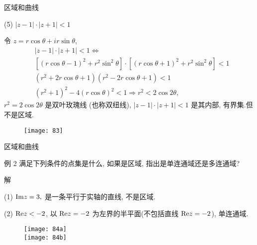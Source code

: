 \documentclass{beamer}
\begin{document}
\begin{frame}{区域和曲线}
\begin{block}{}
(5) $ \left| {z - 1} \right| \cdot \left| {z + 1} \right| < 1 $ 

令 $ z = r\cos \theta + ir\sin \theta $, 
\begin{align*}
&\left| {z - 1} \right| \cdot \left| {z + 1} \right| < 1 \Leftrightarrow\\
&[{(r\cos \theta - 1)^2} + {r^2}{\sin ^2}\theta ] \cdot [{(r\cos \theta + 1)^2} + {r^2}{\sin ^2}\theta ] < 1\\
&({r^2} + 2r\cos \theta + 1)({r^2} - 2r\cos \theta + 1) < 1\\
&{({r^2} + 1)^2} - 4{(r\cos \theta )^2} < 1 \Rightarrow {r^2} < 2\cos 2\theta, 
\end{align*}
 $ {r^2} = 2\cos 2\theta $ 是双叶玫瑰线 (也称双纽线),  $ \left| {z - 1} \right| \cdot \left| {z + 1} \right| < 1 $ 是其内部, 有界集.但不是区域.
\begin{figure}
\texttt{[image: 83]}
\end{figure}

\end{block}
\end{frame}

\begin{frame}{区域和曲线}
\begin{block}{例 2}
满足下列条件的点集是什么, 如果是区域, 指出是单连通域还是多连通域?

解 \begin{minipage}[t]{0.5\linewidth}
(1) $ {\rm Im} z = 3, $ 是一条平行于实轴的直线, 不是区域.
\vspace{20mm}

(2) $ {\rm Re} z < - 2 $,  
以 $ {\rm Re} z = - 2 $ 为左界的半平面(不包括直线 $ {\rm Re} z = - 2 $), 单连通域.

\end{minipage}\qquad
\begin{minipage}[t]{0.3\linewidth}
\begin{figure}\centering\vspace{-3mm}
\texttt{[image: 84a]}\\
\texttt{[image: 84b]}\\
\end{figure}
\end{minipage}

\end{block}
\end{frame}
\end{document}
